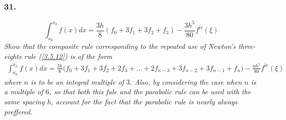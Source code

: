 \documentclass[12pt]{article}
\begin{document}
\subsubsection*{31.}
\begin{equation}
\label{3.5.12}
	\int_{x_0}^{x_3} f(x) dx = \frac{3h}{8} (f_0 + 3f_1 + 3f_2 + f_3) - \frac{3h^5}{80}f^{\text{iv}}(\xi)
\end{equation}
{\it Show that the composite rule corresponding to the repeated use of Newton's {\rm three-eights} rule (\ref{3.5.12}) is of the form}
\begin{align*}
	\int_{x_0}^{x_n} f(x) dx = \frac{3h}{8}\big(f_0 + 3f_1 + 3f_2 + 2f_3 + \dots + 2f_{n-3} + 3f_{n-2} + 3f_{n-1} + f_n\big) - \frac{nh^5}{80}f^{\text{iv}}(\xi)
\end{align*}
{\it where $n$ is to be an integral multiple of $3$.  Also, by considering the case when $n$ is a multiple of $6$, so that both this fule and the parabolic rule can be used with the same spacing $h$, account for the fact that the parabolic rule is nearly always preffered.} \\
\end{document}

